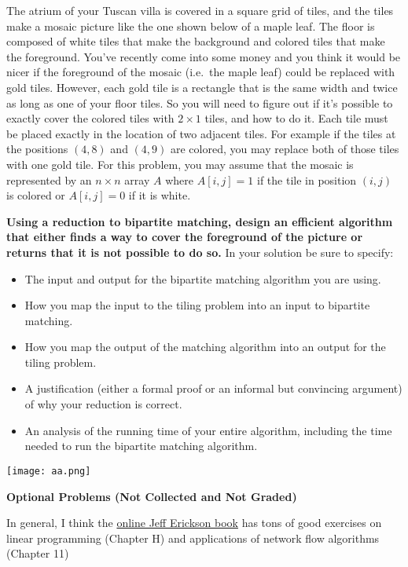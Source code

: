 \documentclass[11pt]{article}
\theoremstyle{definition}
\begin{document}
\begin{enumerate}[leftmargin=0pt]
\problemitem
The atrium of your Tuscan villa is covered in a square grid of tiles, and the tiles make a mosaic picture like the one shown below of a maple leaf.  The floor is composed of white tiles that make the background and colored tiles that make the foreground.  You've recently come into some money and you think it would be nicer if the foreground of the mosaic (i.e.\ the maple leaf) could be replaced with gold tiles.  However, each gold tile is a rectangle that is the same width and twice as long as one of your floor tiles.  So you will need to figure out if it's possible to exactly cover the colored tiles with $2 \times 1$ tiles, and how to do it.  Each tile must be placed exactly in the location of two adjacent tiles.  For example if the tiles at the positions $(4,8)$ and $(4,9)$ are colored, you may replace both of those tiles with one gold tile.  For this problem, you may assume that the mosaic is represented by an $n \times n$ array $A$ where $A[i,j] = 1$ if the tile in position $(i,j)$ is colored or $A[i,j] = 0$ if it is white.

{\bf Using a reduction to bipartite matching, design an efficient algorithm that either finds a way to cover the foreground of the picture or returns that it is not possible to do so.}  In your solution be sure to specify:
\begin{itemize}
    \item The input and output for the bipartite matching algorithm you are using.
    \item How you map the input to the tiling problem into an input to bipartite matching.
    \item How you map the output of the matching algorithm into an output for the tiling problem.
    \item A justification (either a formal proof or an informal but convincing argument) of why your reduction is correct.
    \item An analysis of the running time of your entire algorithm, including the time needed to run the bipartite matching algorithm.
\end{itemize}

\begin{center}
\texttt{[image: aa.png]}
\end{center}

\noindent\textbf{\color{red} Optional Problems (Not Collected and Not Graded)}

In general, I think the \href{https://jeffe.cs.illinois.edu/teaching/algorithms/}{online Jeff Erickson book} has tons of good exercises on linear programming (Chapter H) and applications of network flow algorithms (Chapter 11) 


\end{enumerate}
\end{document}

